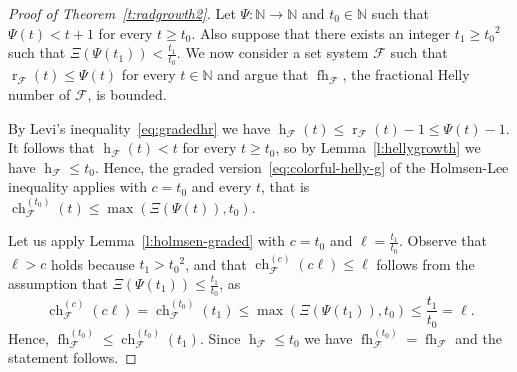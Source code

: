\documentclass[a4paper,UKenglish,thm-restate]{article}
\newcommand{\N}{\mathbb{N}}
\newcommand{\F}{\mathcal{F}}
\DeclareMathOperator{\h}{h}
\DeclareMathOperator{\rad}{r}
\DeclareMathOperator{\ch}{ch}
\DeclareMathOperator{\fh}{fh}
\newcommand{\pth}[1]{\left(#1\right)}
\begin{document}
\begin{proof}[Proof of Theorem~\ref{t:radgrowth2}]
  Let $\Psi: \N\rightarrow \N$ and $t_0 \in \N$ such that $\Psi(t) < t+1$ for every $t \ge t_0$. Also suppose that there exists an integer $t_1 \ge {t_0}^2$ such that $\Xi\pth{\Psi(t_1)} < \frac{t_1}{t_0}$. We now consider a set system $\F$ such that $\rad_\F(t) \le \Psi(t)$ for every $t \in \N$ and argue that $\fh_\F$, the fractional Helly number of $\F$, is bounded. 

  \medskip

  By Levi's inequality~\eqref{eq:gradedhr} we have $\h_\F(t) \le \rad_\F(t) -1 \le \Psi(t) -1$. It follows that $\h_\F(t) < t$ for every $t \ge t_0$, so by Lemma~\ref{l:hellygrowth} we have $\h_\F \le t_0$. Hence, the graded version~\eqref{eq:colorful-helly-g} of the Holmsen-Lee inequality applies with $c=t_0$ and every $t$, that is $\ch^{(t_0)}_\F(t) \leq \max\pth{\Xi\pth{\Psi(t)},t_0}$.

  \medskip

  Let us apply Lemma~\ref{l:holmsen-graded} with $c=t_0$ and $\ell = \frac{t_1}{t_0}$. Observe that $\ell > c$ holds because $t_1 > {t_0}^2$, and that $\ch^{(c)}_\F(c\ell) \le \ell$ follows from the assumption that $\Xi\pth{\Psi(t_1)} \le \frac{t_1}{t_0}$, as
%
  \[  \ch^{(c)}_\F(c\ell) = \ch^{(t_0)}_\F\pth{t_1} \le \max\pth{\Xi\pth{\Psi(t_1)},t_0} \le \frac{t_1}{t_0} = \ell.\]
%
Hence, $\fh^{(t_0)}_\F \leq \ch^{(t_0)}_\F(t_1)$. Since $\h_\F \le t_0$ we have $\fh^{(t_0)}_\F = \fh_\F$ and the statement follows.  
\end{proof}
\end{document}
